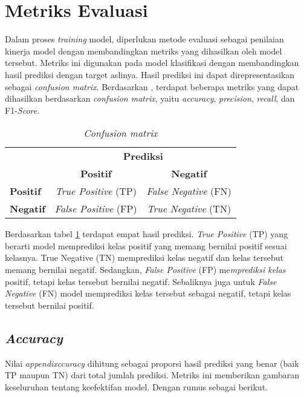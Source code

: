 \section{Metriks Evaluasi}

Dalam proses \textit{training} model, diperlukan metode evaluasi sebagai penilaian kinerja model dengan membandingkan metriks yang dihasilkan oleh model tersebut. Metriks ini digunakan pada model klasifikasi dengan membandingkan hasil prediksi dengan target aslinya. Hasil prediksi ini dapat direpresentasikan sebagai \textit{confusion matrix}. Berdasarkan \citeauthor{metrics}, terdapat beberapa metriks yang dapat dihasilkan berdasarkan \textit{confusion matrix}, yaitu \textit{accuracy}, \textit{precision}, \textit{recall}, dan F1-\textit{Score}.

\begin{table}[ht]
\centering
\caption{\textit{Confusion matrix}}
\label{confusion-matrix}
\begin{tabular}{|l|c|c|}
\hline
\rowcolor{black!10}
\multicolumn{1}{|c|}{\textbf{Target}} & \multicolumn{2}{c|}{\textbf{Prediksi}} \\ \cline{2-3} 
\rowcolor{black!10}
& \textbf{Positif} & \textbf{Negatif} \\ \hline
\textbf{Positif} & \textit{True Positive} (TP) & \textit{False Negative} (FN) \\ \hline
\textbf{Negatif} & \textit{False Positive} (FP) & \textit{True Negative} (TN) \\ \hline
\end{tabular}
\end{table}

Berdasarkan tabel \ref{confusion-matrix} terdapat empat hasil prediksi. \textit{True Positive} (TP) yang berarti model memprediksi kelas positif yang memang bernilai positif sesuai kelasnya. True Negative (TN) memprediksi kelas negatif dan kelas tersebut memang bernilai negatif. Sedangkan, \textit{False Positive} (FP) me\textit{mprediksi kelas} positif, tetapi kelas tersebut bernilai negatif. Sebaliknya juga untuk \textit{False Negative} (FN) model memprediksi kelas tersebut sebagai negatif, tetapi kelas tersebut bernilai positif.

\subsection{\textit{Accuracy}}
Nilai \textit{appendixccuracy} dihitung sebagai proporsi hasil prediksi yang benar (baik TP maupun TN) dari total jumlah prediksi. Metriks ini memberikan gambaran keseluruhan tentang keefektifan model. Dengan rumus sebagai berikut.

